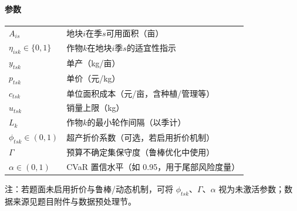 \paragraph{参数}
\begin{table}[H]\centering
\begin{tabular}{@{}ll@{}}\toprule
\(A_{i s}\) & 地块\(i\)在季\(s\)可用面积（亩） \\
\(\eta_{i s k}\in\{0,1\}\) & 作物\(k\)在地块\(i\)季\(s\)的适宜性指示 \\
\(y_{t s k}\) & 单产（kg/亩） \\
\(p_{t s k}\) & 单价（元/kg） \\
\(c_{t s k}\) & 单位面积成本（元/亩，含种植/管理等） \\
\(u_{t s k}\) & 销量上限（kg） \\
\(L_k\) & 作物\(k\)的最小轮作间隔（以季计） \\
\(\phi_{t s k}\in(0,1)\) & 超产折价系数（可选，若启用折价机制） \\
\(\Gamma\) & 预算不确定集保守度（鲁棒优化中使用） \\
\(\alpha\in(0,1)\) & CVaR 置信水平（如 0.95，用于尾部风险度量） \\
\bottomrule\end{tabular}
\end{table}

\noindent 注：若题面未启用折价与鲁棒/动态机制，可将 \(\phi_{t s k}\)、\(\Gamma\)、\(\alpha\) 视为未激活参数；数据来源见题目附件与数据预处理节。